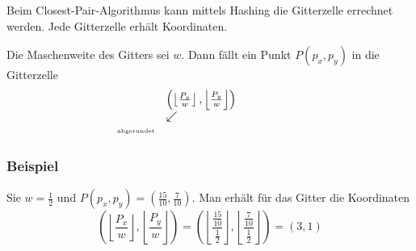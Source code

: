 \documentclass{scrartcl}%
\begin{document}
    Beim Closest-Pair-Algorithmus kann mittels Hashing die Gitterzelle errechnet werden. Jede Gitterzelle erhält Koordinaten.
    \begin{figure}[H]
        \centering
    \end{figure}
    Die Maschenweite des Gitters sei $w$.
    Dann fällt ein Punkt $P(p_x,p_y)$ in die Gitterzelle
    \begin{equation*}
        \begin{array}{lll}
            & \left(\left\lfloor\frac{P_x}{w}\right\rfloor,\left\lfloor\frac{P_y}{w}\right\rfloor\right) &\\
            & \swarrow\;\;\;& \\
            \mbox{\tiny{abgerundet}} & & \phantom{\mbox{abgerundet}}
        \end{array}

    \end{equation*}

    \subsubsection*{Beispiel}
    Sie $w=\frac{1}{2}$ und $P(p_x,p_y)=\left(\frac{15}{10}, \frac{7}{10}\right)$.
    Man erhält für das Gitter die Koordinaten
    \begin{equation*}
        \left(\left\lfloor\frac{P_x}{w}\right\rfloor,\left\lfloor\frac{P_y}{w}\right\rfloor\right)
        =  \left(\left\lfloor\frac{\frac{15}{10}}{\frac{1}{2}}\right\rfloor,\left\lfloor\frac{\frac{7}{10}}{\frac{1}{2}}\right\rfloor\right) = (3,1)
    \end{equation*}
\end{document}
